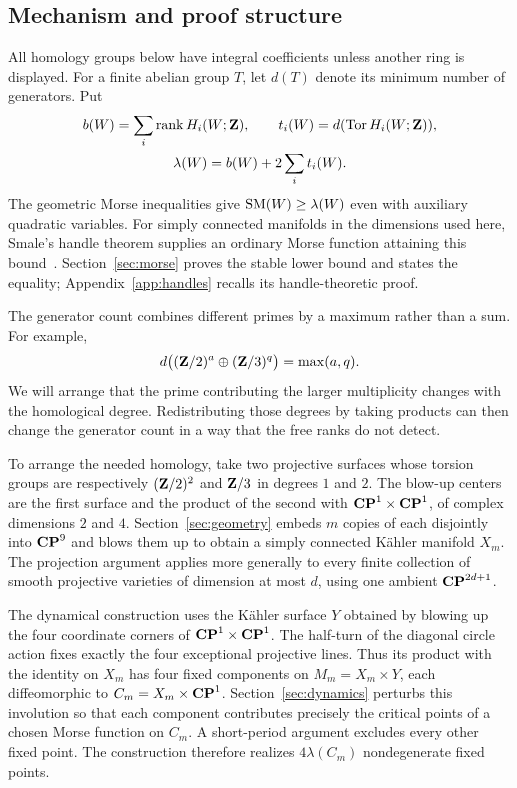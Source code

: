 \subsection*{Mechanism and proof structure}
All homology groups below have integral coefficients unless another ring
is displayed. For a finite abelian group $T$, let $d(T)$ denote its minimum
number of generators. Put
\begin{equation}\label{intro:lambda}
\begin{gathered}
 b(W)=\sum_i\operatorname{rank} H_i(W;\mathbf Z),\qquad
 t_i(W)=d(\operatorname{Tor} H_i(W;\mathbf Z)),\\
 \lambda(W)=b(W)+2\sum_i t_i(W).
\end{gathered}
\end{equation}
The geometric Morse inequalities give $\operatorname{SM}(W)\geq\lambda(W)$ even with
auxiliary quadratic variables. For simply connected manifolds in the
dimensions used here, Smale's handle theorem supplies an ordinary Morse
function attaining this bound~\cite[Theorem~2.4 and the following
paragraph]{Smale1963}. Section~\ref{sec:morse} proves the stable lower
bound and states the equality; Appendix~\ref{app:handles} recalls its
handle-theoretic proof.

The generator count combines different primes by a maximum rather than
a sum. For example,
\[
 d\bigl((\mathbf Z/2)^a\oplus(\mathbf Z/3)^q\bigr)=\max(a,q).
\]
We will arrange that the prime contributing the larger multiplicity
changes with the homological degree. Redistributing those degrees by
taking products can then change the generator count in a way that the
free ranks do not detect.

To arrange the needed homology, take two projective surfaces whose torsion
groups are respectively $(\mathbf Z/2)^2$ and $\mathbf Z/3$ in degrees $1$ and $2$.
The blow-up centers are the first surface and the product of the second
with $\mathbf{CP}^1\times\mathbf{CP}^1$, of complex dimensions $2$ and $4$.
Section~\ref{sec:geometry} embeds $m$ copies of each disjointly into
$\mathbf{CP}^9$ and blows them up to obtain a simply connected Kähler manifold
$X_m$. The projection argument applies more generally to every finite
collection of smooth projective varieties of dimension at most $d$, using
one ambient $\mathbf{CP}^{2d+1}$.

The dynamical construction uses the Kähler surface $Y$ obtained by blowing
up the four coordinate corners of $\mathbf{CP}^1\times\mathbf{CP}^1$. The half-turn of the
diagonal circle action fixes exactly the four exceptional projective lines.
Thus its product with the identity on $X_m$ has four fixed components on
$M_m=X_m\times Y$, each diffeomorphic to $C_m=X_m\times\mathbf{CP}^1$.
Section~\ref{sec:dynamics} perturbs this involution so that each component
contributes precisely the critical points of a chosen Morse function on
$C_m$. A short-period argument excludes every other fixed point. The
construction therefore realizes $4\lambda(C_m)$ nondegenerate fixed points.

